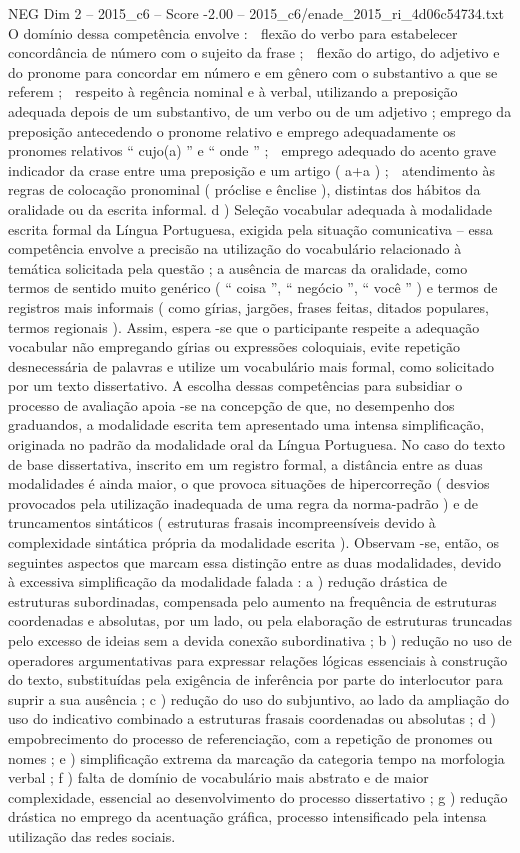 \begin{textsample}{NEG Dim 2 – 2015\_c6 – Score -2.00 – 2015\_c6/enade\_2015\_ri\_4d06c54734.txt}
O domínio dessa competência envolve :  flexão do verbo para estabelecer concordância de número com o sujeito da frase ;  flexão do artigo, do adjetivo e do pronome para concordar em número e em gênero com o substantivo a que se referem ;  respeito à regência nominal e à verbal, utilizando a preposição adequada depois de um substantivo, de um verbo ou de um adjetivo ; emprego da preposição antecedendo o pronome relativo e emprego adequadamente os pronomes relativos “ cujo(a) ” e “ onde ” ;  emprego adequado do acento grave indicador da crase entre uma preposição e um artigo ( a+a ) ;  atendimento às regras de colocação pronominal ( próclise e ênclise ), distintas dos hábitos da oralidade ou da escrita informal. d ) Seleção vocabular adequada à modalidade escrita formal da Língua Portuguesa, exigida pela situação comunicativa – essa competência envolve a precisão na utilização do vocabulário relacionado à temática solicitada pela questão ; a ausência de marcas da oralidade, como termos de sentido muito genérico ( “ coisa ”, “ negócio ”, “ você ” ) e termos de registros mais informais ( como gírias, jargões, frases feitas, ditados populares, termos regionais ).
Assim, espera -se que o participante respeite a adequação vocabular não empregando gírias ou expressões coloquiais, evite repetição desnecessária de palavras e utilize um vocabulário mais formal, como solicitado por um texto dissertativo.
A escolha dessas competências para subsidiar o processo de avaliação apoia -se na concepção de que, no desempenho dos graduandos, a modalidade escrita tem apresentado uma intensa simplificação, originada no padrão da modalidade oral da Língua Portuguesa.
No caso do texto de base dissertativa, inscrito em um registro formal, a distância entre as duas modalidades é ainda maior, o que provoca situações de hipercorreção ( desvios provocados pela utilização inadequada de uma regra da norma-padrão ) e de truncamentos sintáticos ( estruturas frasais incompreensíveis devido à complexidade sintática própria da modalidade escrita ).
Observam -se, então, os seguintes aspectos que marcam essa distinção entre as duas modalidades, devido à excessiva simplificação da modalidade falada : a ) redução drástica de estruturas subordinadas, compensada pelo aumento na frequência de estruturas coordenadas e absolutas, por um lado, ou pela elaboração de estruturas truncadas pelo excesso de ideias sem a devida conexão subordinativa ; b ) redução no uso de operadores argumentativas para expressar relações lógicas essenciais à construção do texto, substituídas pela exigência de inferência por parte do interlocutor para suprir a sua ausência ; c ) redução do uso do subjuntivo, ao lado da ampliação do uso do indicativo combinado a estruturas frasais coordenadas ou absolutas ; d ) empobrecimento do processo de referenciação, com a repetição de pronomes ou nomes ; e ) simplificação extrema da marcação da categoria tempo na morfologia verbal ; f ) falta de domínio de vocabulário mais abstrato e de maior complexidade, essencial ao desenvolvimento do processo dissertativo ; g ) redução drástica no emprego da acentuação gráfica, processo intensificado pela intensa utilização das redes sociais.

\end{textsample}
